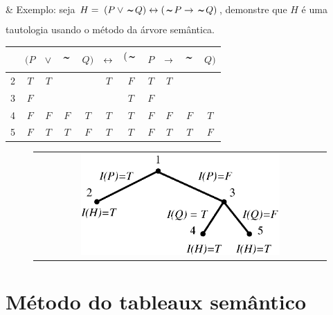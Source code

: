 
\begin{easylist}
  & Exemplo: seja $H = \; (P \OR \NOT Q) \BIC (\NOT P \IMP \NOT Q)$, demonstre que $H$ é uma tautologia usando o método da árvore semântica.
\end{easylist}

\begin{center}
  \begin{tabular}{ c|cccccccccc }
        & $(P$ & $\lor$ & $\NOT$ & $Q)$ & $\leftrightarrow$ & $(\NOT$ & $P$ & $\rightarrow$ & $\NOT$ & $Q)$ \\
    \hline
      2 & $T$  & $T$   &        &      & $T$    & $F$     & $T$ & $T$    &        &      \\
    \hline
      3 & $F$  &       &        &      &        & $T$     & $F$ &        &        &      \\
    \hline
      4 & $F$  & $F$   & $F$    & $T$  & $T$    & $T$     & $F$ & $F$    & $F$    & $T$  \\
    \hline
      5 & $F$  & $T$   & $T$    & $F$  & $T$    & $T$     & $F$ & $T$    & $T$    & $F$  \\
  \end{tabular}
\end{center}

\begin{figure}[h!]
  \begin{center}
    \begin{tabular}{c}
      \includegraphics[width=0.7\textwidth]{images/04/tree_02.eps}
    \end{tabular}
  \end{center}
\end{figure}


\section{Método do tableaux semântico}

